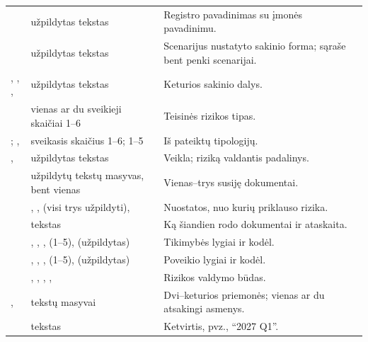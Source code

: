 \par\nopagebreak
\begin{xltabular}{\textwidth}{@{}L{44mm}L{36mm}Y@{}}
\toprule
{} &  &  \\
\midrule
\endhead
\bottomrule
\endlastfoot
{} & užpildytas tekstas & Registro pavadinimas su įmonės pavadinimu. \\
 & užpildytas tekstas & Scenarijus nustatyto sakinio forma; sąraše bent penki scenarijai. \\
, , ,  & užpildytas tekstas & Keturios sakinio dalys. \\
 & vienas ar du sveikieji skaičiai 1--6 & Teisinės rizikos tipas. \\
; ,  & sveikasis skaičius 1--6; 1--5 & Iš pateiktų tipologijų. \\
,  & užpildytas tekstas & Veikla; riziką valdantis padalinys. \\
 & užpildytų tekstų masyvas, bent vienas & Vienas--trys susiję dokumentai. \\
 & , ,  (visi trys užpildyti),  & Nuostatos, nuo kurių priklauso rizika. \\
 & tekstas & Ką šiandien rodo dokumentai ir ataskaita. \\
 & , , ,  (1--5),  (užpildytas) & Tikimybės lygiai ir kodėl. \\
 & , , ,  (1--5),  (užpildytas) & Poveikio lygiai ir kodėl. \\
 & , , , ,  & Rizikos valdymo būdas. \\
,  & tekstų masyvai & Dvi--keturios priemonės; vienas ar du atsakingi asmenys. \\
 & tekstas & Ketvirtis, pvz., \enquote{2027 Q1}. \\
\end{xltabular}

